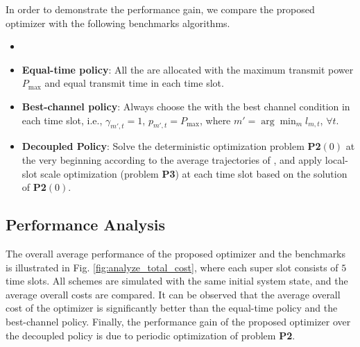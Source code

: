In order to demonstrate the performance gain, we compare the proposed {\fwName} optimizer with the following benchmarks algorithms.
\begin{itemize}%
    \item {}%
    \item \textbf{Equal-time policy}: All the {\IAVs} are allocated with the maximum transmit power $P_{\max}$ and equal transmit time in each time slot.
    \item \textbf{Best-channel policy}: Always choose the {\IAV} with the best channel condition in each time slot, i.e., $\gamma_{m',t}=1$, $p_{m',t} = P_{\max}$, where $m' = \arg\min_{m} l_{m,t}$, $\forall t$.
    \item \textbf{Decoupled Policy}: Solve the deterministic optimization problem \textbf{P2$(0)$} at the very beginning according to the average trajectories of {\IAVs}, and apply local-slot scale optimization (problem \textbf{P3}) at each time slot based on the solution of \textbf{P2$(0)$}.
\end{itemize}

\subsection{Performance Analysis}
\label{subsec:performance}

The overall average performance of the proposed {\fwName} optimizer and the benchmarks is illustrated in Fig. \ref{fig:analyze_total_cost}, where each super slot consists of $5$ time slots.
All schemes are simulated with the same initial system state, and the average overall costs are compared. It can be observed that the average overall cost of the {\fwName} optimizer is significantly better than the equal-time policy and the best-channel policy.
%
Finally, the performance gain of the proposed {\fwName} optimizer over the decoupled policy is due to periodic optimization of problem \textbf{P2}.


